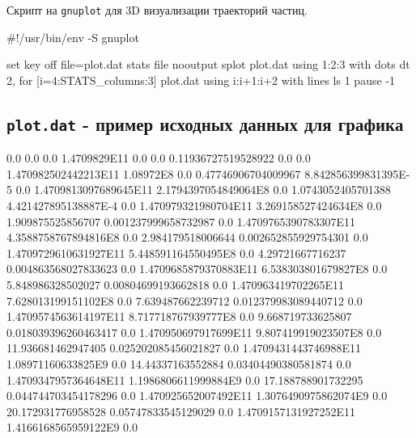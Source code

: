 \documentclass[
  12pt,
  a4paper,
]{article}
\newenvironment{Shaded}{}{}
\newcommand{\NormalTok}[1]{#1}
\begin{document}
Скрипт на \texttt{gnuplot} для 3D визуализации траекторий частиц.

\begin{Shaded}
\begin{Highlighting}[]
\NormalTok{\#!/usr/bin/env {-}S gnuplot}

\NormalTok{set key off}
\NormalTok{file=\textquotesingle{}plot.dat\textquotesingle{}}
\NormalTok{stats file nooutput}
\NormalTok{splot \textquotesingle{}plot.dat\textquotesingle{} using 1:2:3 with dots dt 2, for [i=4:STATS\_columns:3] \textquotesingle{}plot.dat\textquotesingle{} using i:i+1:i+2 with lines ls 1}
\NormalTok{pause {-}1}
\end{Highlighting}
\end{Shaded}

\hypertarget{plot.dat---ux43fux440ux438ux43cux435ux440-ux438ux441ux445ux43eux434ux43dux44bux445-ux434ux430ux43dux43dux44bux445-ux434ux43bux44f-ux433ux440ux430ux444ux438ux43aux430}{%
\subsection{\texorpdfstring{\texttt{plot.dat} - пример исходных данных
для
графика}{plot.dat - пример исходных данных для графика}}\label{plot.dat---ux43fux440ux438ux43cux435ux440-ux438ux441ux445ux43eux434ux43dux44bux445-ux434ux430ux43dux43dux44bux445-ux434ux43bux44f-ux433ux440ux430ux444ux438ux43aux430}}

\begin{Shaded}
\begin{Highlighting}[]
\NormalTok{0.0 0.0 0.0 1.4709829E11 0.0 0.0}
\NormalTok{0.11936727519528922 0.0 0.0 1.470982502442213E11 1.08972E8 0.0}
\NormalTok{0.47746906704009967 8.842856399831395E{-}5 0.0 1.4709813097689645E11 2.1794397054849064E8 0.0}
\NormalTok{1.0743052405701388 4.421427895138887E{-}4 0.0 1.470979321980704E11 3.269158527424634E8 0.0}
\NormalTok{1.909875525856707 0.001237999658732987 0.0 1.4709765390783307E11 4.3588758767894816E8 0.0}
\NormalTok{2.984179518006644 0.002652855929754301 0.0 1.4709729610631927E11 5.448591164550495E8 0.0}
\NormalTok{4.29721667716237 0.004863568027833623 0.0 1.4709685879370883E11 6.538303801679827E8 0.0}
\NormalTok{5.848986328502027 0.00804699193662818 0.0 1.470963419702265E11 7.628013199151102E8 0.0}
\NormalTok{7.639487662239712 0.012379983089440712 0.0 1.4709574563614197E11 8.717718767939777E8 0.0}
\NormalTok{9.668719733625807 0.018039396260463417 0.0 1.470950697917699E11 9.807419919023507E8 0.0}
\NormalTok{11.936681462947405 0.025202085456021827 0.0 1.4709431443746988E11 1.08971160633825E9 0.0}
\NormalTok{14.44337163552884 0.03404490380581874 0.0 1.4709347957364648E11 1.1986806611999884E9 0.0}
\NormalTok{17.188788901732295 0.044744703454178296 0.0 1.470925652007492E11 1.3076490975862074E9 0.0}
\NormalTok{20.172931776958528 0.05747833545129029 0.0 1.4709157131927252E11 1.4166168565959122E9 0.0}
\end{Highlighting}
\end{Shaded}
\end{document}
